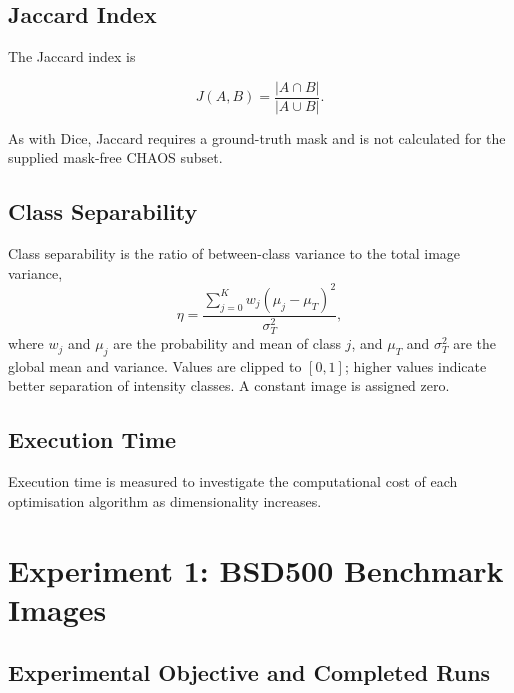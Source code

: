 \documentclass[review]{elsarticle}
\begin{document}
\subsection{Jaccard Index}

The Jaccard index is

\begin{equation}
J(A,B)
=
\frac{|A\cap B|}
{|A\cup B|}.
\end{equation}

As with Dice, Jaccard requires a ground-truth mask and is not calculated for
the supplied mask-free CHAOS subset.


\subsection{Class Separability}

Class separability is the ratio of between-class variance to the total image
variance,
\begin{equation}
\eta =
\frac{\sum_{j=0}^{K} w_j(\mu_j-\mu_T)^2}{\sigma_T^2},
\end{equation}
where $w_j$ and $\mu_j$ are the probability and mean of class $j$, and
$\mu_T$ and $\sigma_T^2$ are the global mean and variance. Values are
clipped to $[0,1]$; higher values indicate better separation of intensity
classes. A constant image is assigned zero.


\subsection{Execution Time}

Execution time is measured to investigate the computational cost of
each optimisation algorithm as dimensionality increases.






\section{Experiment 1: BSD500 Benchmark Images}

\label{sec:experiment1}

\subsection{Experimental Objective and Completed Runs}
\end{document}
